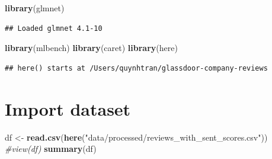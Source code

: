 \documentclass[
]{article}
\newenvironment{Shaded}{\begin{snugshade}}{\end{snugshade}}
\newcommand{\CommentTok}[1]{\textcolor[rgb]{0.56,0.35,0.01}{\textit{#1}}}
\newcommand{\FunctionTok}[1]{\textcolor[rgb]{0.13,0.29,0.53}{\textbf{#1}}}
\newcommand{\NormalTok}[1]{#1}
\newcommand{\OtherTok}[1]{\textcolor[rgb]{0.56,0.35,0.01}{#1}}
\newcommand{\StringTok}[1]{\textcolor[rgb]{0.31,0.60,0.02}{#1}}
\begin{document}
\begin{Shaded}
\begin{Highlighting}[]
\FunctionTok{library}\NormalTok{(glmnet)}
\end{Highlighting}
\end{Shaded}

\begin{verbatim}
## Loaded glmnet 4.1-10
\end{verbatim}

\begin{Shaded}
\begin{Highlighting}[]
\FunctionTok{library}\NormalTok{(mlbench)}
\FunctionTok{library}\NormalTok{(caret)}
\FunctionTok{library}\NormalTok{(here)}
\end{Highlighting}
\end{Shaded}

\begin{verbatim}
## here() starts at /Users/quynhtran/glassdoor-company-reviews
\end{verbatim}

\section{Import dataset}\label{import-dataset}

\begin{Shaded}
\begin{Highlighting}[]
\NormalTok{df }\OtherTok{\textless{}{-}} \FunctionTok{read.csv}\NormalTok{(}\FunctionTok{here}\NormalTok{(}\StringTok{"data/processed/reviews\_with\_sent\_scores.csv"}\NormalTok{))}
\CommentTok{\#view(df)}
\FunctionTok{summary}\NormalTok{(df)}
\end{Highlighting}
\end{Shaded}
\end{document}
